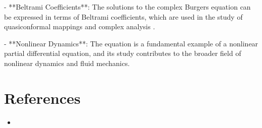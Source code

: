 \documentclass[11pt,a4paper]{article}
\begin{document}
- **Beltrami Coefficients**: The solutions to the complex Burgers equation can be expressed in terms of Beltrami coefficients, which are used in the study of quasiconformal mappings and complex analysis \cite{2602.19251v1}.

- **Nonlinear Dynamics**: The equation is a fundamental example of a nonlinear partial differential equation, and its study contributes to the broader field of nonlinear dynamics and fluid mechanics.

\section{References}
\begin{itemize}
    \item {}
\end{itemize}
\end{document}
